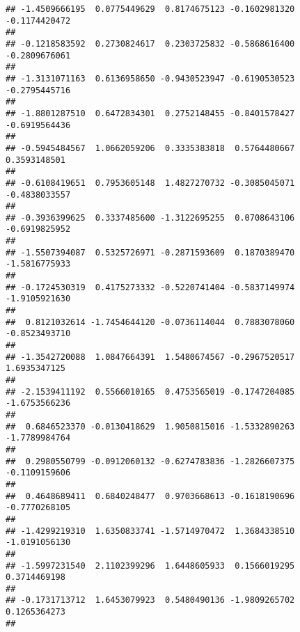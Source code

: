 \documentclass[]{article}
\begin{document}
\begin{verbatim}
## -1.4509666195  0.0775449629  0.8174675123 -0.1602981320 -0.1174420472 
##                                                                       
## -0.1218583592  0.2730824617  0.2303725832 -0.5868616400 -0.2809676061 
##                                                                       
## -1.3131071163  0.6136958650 -0.9430523947 -0.6190530523 -0.2795445716 
##                                                                       
## -1.8801287510  0.6472834301  0.2752148455 -0.8401578427 -0.6919564436 
##                                                                       
## -0.5945484567  1.0662059206  0.3335383818  0.5764480667  0.3593148501 
##                                                                       
## -0.6108419651  0.7953605148  1.4827270732 -0.3085045071 -0.4838033557 
##                                                                       
## -0.3936399625  0.3337485600 -1.3122695255  0.0708643106 -0.6919825952 
##                                                                       
## -1.5507394087  0.5325726971 -0.2871593609  0.1870389470 -1.5816775933 
##                                                                       
## -0.1724530319  0.4175273332 -0.5220741404 -0.5837149974 -1.9105921630 
##                                                                       
##  0.8121032614 -1.7454644120 -0.0736114044  0.7883078060 -0.8523493710 
##                                                                       
## -1.3542720088  1.0847664391  1.5480674567 -0.2967520517  1.6935347125 
##                                                                       
## -2.1539411192  0.5566010165  0.4753565019 -0.1747204085 -1.6753566236 
##                                                                       
##  0.6846523370 -0.0130418629  1.9050815016 -1.5332890263 -1.7789984764 
##                                                                       
##  0.2980550799 -0.0912060132 -0.6274783836 -1.2826607375 -0.1109159606 
##                                                                       
##  0.4648689411  0.6840248477  0.9703668613 -0.1618190696 -0.7770268105 
##                                                                       
## -1.4299219310  1.6350833741 -1.5714970472  1.3684338510 -1.0191056130 
##                                                                       
## -1.5997231540  2.1102399296  1.6448605933  0.1566019295  0.3714469198 
##                                                                       
## -0.1731713712  1.6453079923  0.5480490136 -1.9809265702  0.1265364273 
##                                                                       

\end{verbatim}
\end{document}
